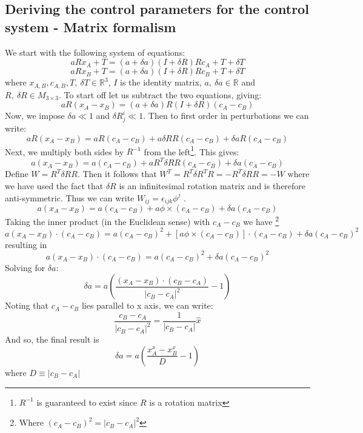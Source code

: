 \documentclass[aps, prd, amsmath, floats, floatfix, twocolumn,superscriptaddress, nofootinbib, showpacs]{revtex4-1}
\theoremstyle{plain}
\theoremstyle{definition}
\begin{document}
\subsection*{Deriving the control parameters for the control system - Matrix formalism}
We start with the following system of equations:
\[ aRx_{A} + T = (a+\delta a) (I+\delta R)R c_{A} +T + \delta T \]
\[ aRx_{B} + T = (a+\delta a) (I+\delta R)R c_{B} +T + \delta T  \]
where $ x_{A,B}, c_{A,B}, T, \ \delta T \in \mathbb{R}^{3} $, $ I $ is the identity matrix, $ a,\ \delta a \in \mathbb{R} $ and $ R,\ \delta R \in M_{3\times 3} $. To start off let us subtract the two equations, giving:
\[  aR(x_{A} - x_{B})= (a+\delta a) R (I+\delta R) (c_{A} - c_{B}) \]
Now, we impose $ \delta a \ll1 $ and $\delta R^{i}_{j}\ll 1 $. Then to first order in perturbations we can write:
\begin{equation}
aR(x_{A} - x_{B})= aR(c_{A} - c_{B}) + a\delta R R(c_{A} - c_{B}) + \delta a R (c_{A} - c_{B})
\end{equation}
Next, we multiply both sides by $ R^{-1} $ from the left\footnote{$ R^{-1} $ is guaranteed to exist since $ R $ is a rotation matrix}. This gives:
\[
a(x_{A} - x_{B})= a(c_{A} - c_{B}) + aR^{T}\delta R R(c_{A} - c_{B}) +\delta a  (c_{A} - c_{B})
\]
Define $W=R^{T}\delta RR $. Then it follows that $W^{T}=R^{T}\delta R^{T}R=-R^{T}\delta RR=-W$ where we have used the fact that $\delta R$ is an infinitesimal rotation matrix and is therefore anti-symmetric.
Thus we can write $W_{ij}=\epsilon_{ijk}\phi^{j}$ .
\[ a(x_{A} - x_{B})= a(c_{A} - c_{B}) + a\phi \times (c_{A} - c_{B}) + \delta a  (c_{A} - c_{B}) \]
Taking the inner product (in the Euclidean sense) with $ c_{A} - c_{B} $ we have \footnote{Where $ (c_{A} - c_{B})^{2}= |c_{B}-c_{A}|^{2} $}
\[a(x_{A} - x_{B})\cdot(c_{A} - c_{B})= a(c_{A} - c_{B})^{2} + [a \phi \times (c_{A} - c_{B})]\cdot (c_{A} - c_{B}) + \delta a  (c_{A} - c_{B})^{2} \]
 resulting in 
\[ a(x_{A} - x_{B})\cdot(c_{A} - c_{B}) =a(c_{A} - c_{B})^{2}+\delta a  (c_{A} - c_{B})^{2}  \]
Solving for $ \delta a  $:
\[ \delta a = a \left( \frac{(x_{A}-x_{B})\cdot(c_{B}-c_{A})}{|c_{B}-c_{A}|^{2}} - 1\right) \]
Noting that $ c_{A} - c_{B} $ lies parallel to x axis, we can write:
\[ \frac{c_{B}-c_{A}}{|c_{B}-c_{A}|^{2}} = \frac{1}{|c_{B}-c_{A}|} \hat{x} \]
And so, the final result is 
\begin{equation}
\delta a = a \left(\frac{x_{A}^{x}- x_{B}^{x}}{D} - 1 \right)
\end{equation}
where $ D \equiv |c_{B}-c_{A}| $ \\
\end{document}
